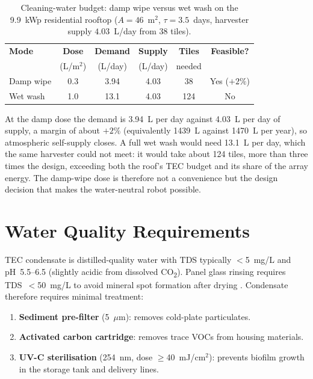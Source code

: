 \documentclass[12pt,a4paper]{report}   %
\begin{document}
\begin{table}[htbp]
\centering
\caption{Cleaning-water budget: damp wipe versus wet wash on the 9.9~kWp residential rooftop
($A = 46$~m$^2$, $\tau = 3.5$~days, harvester supply $4.03$~L/day from 38 tiles).}
\label{tab:damp}
\small
\begin{tabular}{lccccc}
\toprule
\textbf{Mode} & \textbf{Dose} & \textbf{Demand} & \textbf{Supply} &
\textbf{Tiles} & \textbf{Feasible?} \\
 & (L/m$^2$) & (L/day) & (L/day) & needed & \\
\midrule
Damp wipe & 0.3 & 3.94 & 4.03 & 38  & Yes ($+2\%$) \\
Wet wash  & 1.0 & 13.1 & 4.03 & 124 & No \\
\bottomrule
\end{tabular}
\end{table}

\noindent At the damp dose the demand is \SI{3.94}{\liter} per day against \SI{4.03}{\liter} per
day of supply, a margin of about $+2\%$ (equivalently \SI{1439}{\liter} against \SI{1470}{\liter}
per year), so atmospheric self-supply closes. A full wet wash would need \SI{13.1}{\liter} per day,
which the same harvester could not meet: it would take about \num{124} tiles, more than three times
the design, exceeding both the roof's TEC budget and its share of the array energy. The damp-wipe
dose is therefore not a convenience but the design decision that makes the water-neutral robot
possible.

\section{Water Quality Requirements}

TEC condensate is distilled-quality water with TDS typically $<$5~mg/L and pH~5.5--6.5
(slightly acidic from dissolved CO\textsubscript{2}). Panel glass rinsing requires TDS~$<$50~mg/L
to avoid mineral spot formation after drying \cite{beattie2012waterspots}. Condensate therefore
requires minimal treatment:

\begin{enumerate}[leftmargin=*]
  \item \textbf{Sediment pre-filter} (5~$\mu$m): removes cold-plate particulates.
  \item \textbf{Activated carbon cartridge}: removes trace VOCs from housing materials.
  \item \textbf{UV-C sterilisation} (254~nm, dose $\geq$40~mJ/cm$^2$): prevents biofilm growth
  in the storage tank and delivery lines.
\end{enumerate}
\end{document}
